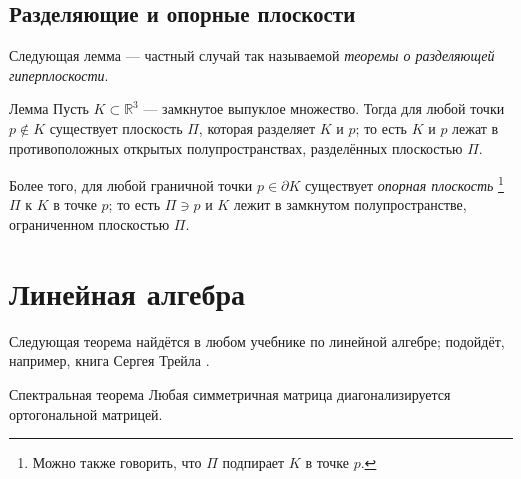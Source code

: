 \begin{multicols}{2}
{\subsection*{Разделяющие и опорные плоскости}

Следующая лемма --- частный случай так называемой \emph{теоремы о разделяющей гиперплоскости}.

\begin{thm}{Лемма}\label{lem:separation}
Пусть $K\subset \mathbb{R}^3$ --- замкнутое выпуклое множество.
Тогда для любой точки $p\notin K$ существует плоскость $\Pi$, которая разделяет $K$ и $p$;
то есть $K$ и $p$ лежат в противоположных открытых полупространствах, разделённых плоскостью $\Pi$.

Более того, для любой граничной точки $p\in\partial K$ существует \emph{опорная плоскость}%
\footnote{Можно также говорить, что $\Pi$ подпирает $K$ в точке $p$.} $\Pi$ к $K$ в точке $p$;
то есть $\Pi\ni p$ и $K$ лежит в замкнутом полупространстве, ограниченном плоскостью $\Pi$.
\end{thm}

\section{Линейная алгебра}

Следующая теорема найдётся в любом учебнике по линейной алгебре;
подойдёт, например, книга Сергея Трейла \cite{treil}.

{\sloppy

\begin{thm}{Спектральная теорема}\label{thm:spectral}
Любая симметричная матрица диагонализируется ортогональной матрицей.
\end{thm}

}

}
\end{multicols}
